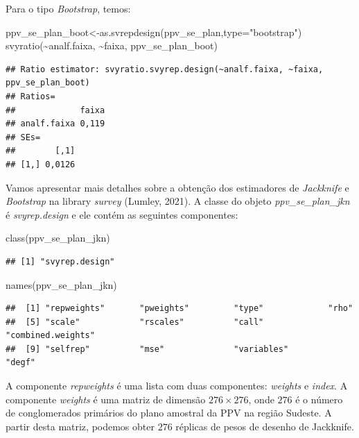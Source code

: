 \documentclass[
  12pt,
  brazilian,
]{book}
\newenvironment{Shaded}{\begin{snugshade}}{\end{snugshade}}
\newcommand{\AttributeTok}[1]{\textcolor[rgb]{0.77,0.63,0.00}{#1}}
\newcommand{\FunctionTok}[1]{\textcolor[rgb]{0.00,0.00,0.00}{#1}}
\newcommand{\NormalTok}[1]{#1}
\newcommand{\OtherTok}[1]{\textcolor[rgb]{0.56,0.35,0.01}{#1}}
\newcommand{\SpecialCharTok}[1]{\textcolor[rgb]{0.00,0.00,0.00}{#1}}
\newcommand{\StringTok}[1]{\textcolor[rgb]{0.31,0.60,0.02}{#1}}
\theoremstyle{definition}
\theoremstyle{definition}
\theoremstyle{definition}
\theoremstyle{definition}
\theoremstyle{remark}
\begin{document}
Para o tipo \emph{Bootstrap}, temos:

\begin{Shaded}
\begin{Highlighting}[]
\NormalTok{ppv\_se\_plan\_boot}\OtherTok{\textless{}{-}}\FunctionTok{as.svrepdesign}\NormalTok{(ppv\_se\_plan,}\AttributeTok{type=}\StringTok{"bootstrap"}\NormalTok{)}
\FunctionTok{svyratio}\NormalTok{(}\SpecialCharTok{\textasciitilde{}}\NormalTok{analf.faixa, }\SpecialCharTok{\textasciitilde{}}\NormalTok{faixa, ppv\_se\_plan\_boot)}
\end{Highlighting}
\end{Shaded}

\begin{verbatim}
## Ratio estimator: svyratio.svyrep.design(~analf.faixa, ~faixa, ppv_se_plan_boot)
## Ratios=
##             faixa
## analf.faixa 0,119
## SEs=
##        [,1]
## [1,] 0,0126
\end{verbatim}

Vamos apresentar mais detalhes sobre a obtenção dos estimadores de \emph{Jackknife} e \emph{Bootstrap} na library \emph{survey} (Lumley, 2021).
A classe do objeto \emph{ppv\_se\_plan\_jkn} é \emph{svyrep.design} e ele contém as seguintes componentes:

\begin{Shaded}
\begin{Highlighting}[]
\FunctionTok{class}\NormalTok{(ppv\_se\_plan\_jkn)}
\end{Highlighting}
\end{Shaded}

\begin{verbatim}
## [1] "svyrep.design"
\end{verbatim}

\begin{Shaded}
\begin{Highlighting}[]
\FunctionTok{names}\NormalTok{(ppv\_se\_plan\_jkn)}
\end{Highlighting}
\end{Shaded}

\begin{verbatim}
##  [1] "repweights"       "pweights"         "type"             "rho"             
##  [5] "scale"            "rscales"          "call"             "combined.weights"
##  [9] "selfrep"          "mse"              "variables"        "degf"
\end{verbatim}

A componente \emph{repweights} é uma lista com duas componentes: \emph{weights} e \emph{index}. A componente
\emph{weights} é uma matriz de dimensão \(276 \times 276\), onde \(276\) é o número de conglomerados primários do plano
amostral da PPV na região Sudeste. A partir desta matriz, podemos obter \(276\) réplicas de pesos de desenho de Jackknife.
\end{document}
